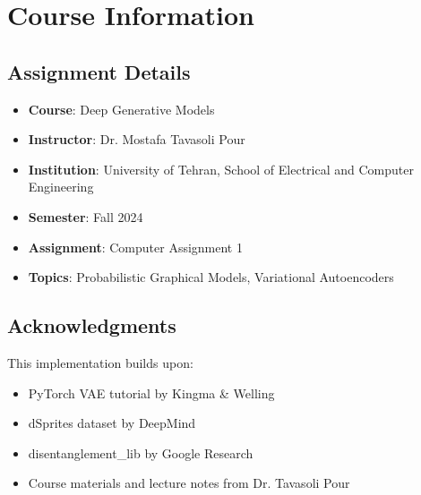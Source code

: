 \documentclass[conference]{IEEEtran}
\begin{document}
\section{Course Information}

\subsection{Assignment Details}
\begin{itemize}
    \item \textbf{Course}: Deep Generative Models
    \item \textbf{Instructor}: Dr. Mostafa Tavasoli Pour
    \item \textbf{Institution}: University of Tehran, School of Electrical and Computer Engineering
    \item \textbf{Semester}: Fall 2024
    \item \textbf{Assignment}: Computer Assignment 1
    \item \textbf{Topics}: Probabilistic Graphical Models, Variational Autoencoders
\end{itemize}

\subsection{Acknowledgments}

This implementation builds upon:
\begin{itemize}
    \item PyTorch VAE tutorial by Kingma \& Welling
    \item dSprites dataset by DeepMind
    \item disentanglement\_lib by Google Research
    \item Course materials and lecture notes from Dr. Tavasoli Pour
\end{itemize}
\end{document}
